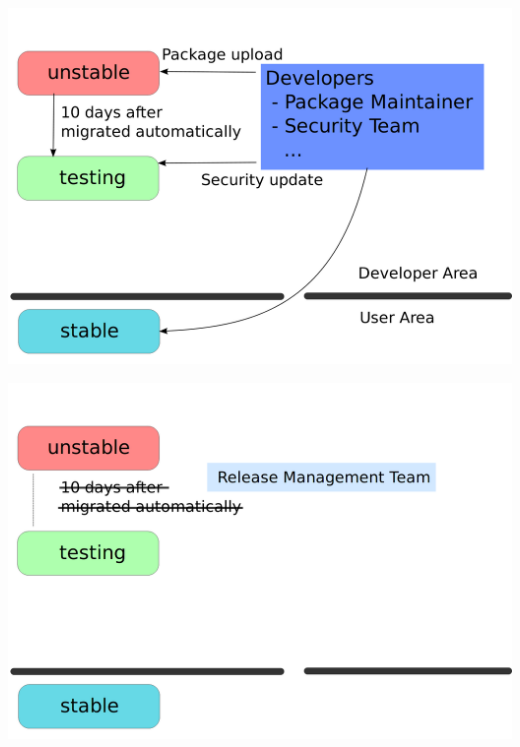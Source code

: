 \documentclass[cjk,c,squeeze,shrink,dvipdfmx,12pt]{beamer}
\begin{document}
{%
  \begin{frame}
    \includegraphics[width=\paperwidth]{./image201011/Debian-Release-Cycle01.png}
  \end{frame}
}
{%
  \begin{frame}
    \includegraphics[width=\paperwidth]{./image201011/Debian-Release-Cycle02.png}
  \end{frame}
}
\end{document}
